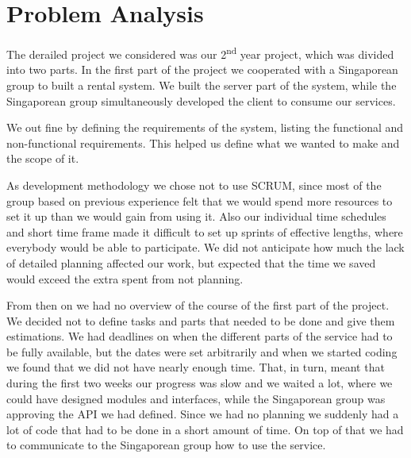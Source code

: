 \section{Problem Analysis}
The derailed project we considered was our 2\textsuperscript{nd} year project, which was divided into two parts. In the first part of the project we cooperated with a Singaporean group to built a rental system. We built the server part of the system, while the Singaporean group simultaneously developed the client to consume our services.

We out fine by defining the requirements of the system, listing the functional and non-functional requirements. This helped us define what we wanted to make and the scope of it.

As development methodology we chose not to use SCRUM, since most of the group based on previous experience felt that we would spend more resources to set it up than we would gain from using it. Also our individual time schedules and short time frame made it difficult to set up sprints of effective lengths, where everybody would be able to participate. We did not anticipate how much the lack of detailed planning affected our work, but expected that the time we saved would exceed the extra spent from not planning.

From then on we had no overview of the course of the first part of the project. We decided not to define tasks and parts that needed to be done and give them estimations.
We had deadlines on when the different parts of the service had to be fully available, but the dates were set arbitrarily and when we started coding we found that we did not have nearly enough time. That, in turn, meant that during the first two weeks our progress was slow and we waited a lot, where we could have designed modules and interfaces, while the Singaporean group was approving the API we had defined. Since we had no planning we suddenly had a lot of code that had to be done in a short amount of time. On top of that we had to communicate to the Singaporean group how to use the service.
 
